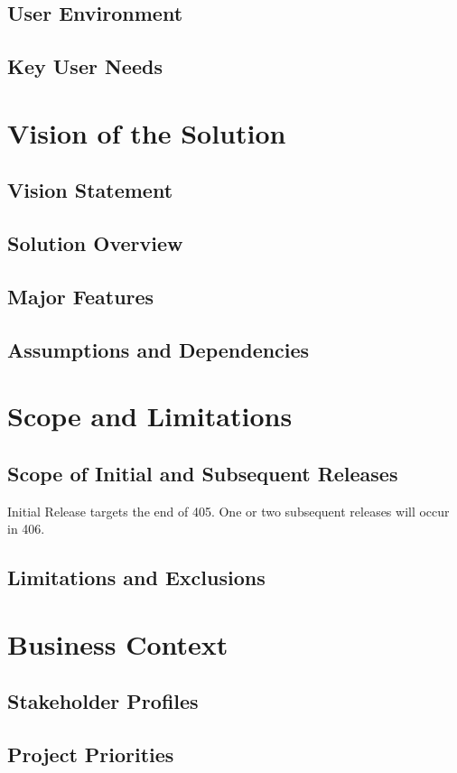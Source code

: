 \documentclass[12pt,oneside,letterpaper]{article}
\begin{document}
\subsection{User Environment}
\subsection{Key User Needs}

\section{Vision of the Solution}
\subsection{Vision Statement}
\subsection{Solution Overview}
\subsection{Major Features}
\subsection{Assumptions and Dependencies}

\section{Scope and Limitations}
\subsection{Scope of Initial and Subsequent Releases}
Initial Release targets the end of 405.  One or two subsequent releases will occur in 406.
\subsection{Limitations and Exclusions}

\section{Business Context}
\subsection{Stakeholder Profiles}
\subsection{Project Priorities}
\end{document}

